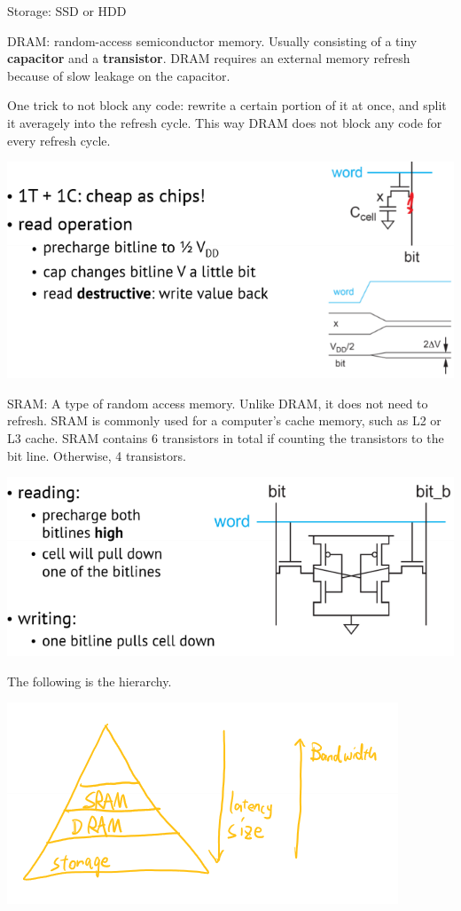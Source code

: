 \documentclass[letterpaper,12pt]{article}
\begin{document}
Storage: SSD or HDD

DRAM: random-access semiconductor memory. Usually consisting of a tiny \textbf{capacitor} and a \textbf{transistor}.
DRAM requires an external memory refresh because of slow leakage on the capacitor.

One trick to not block any code: rewrite a certain portion of it at once, and split it averagely into the refresh cycle. This way DRAM does not block any code for every refresh cycle.

\includegraphics{./Image/DRAM_cells.png}

SRAM: A type of random access memory. Unlike DRAM, it does not need to refresh.
SRAM is commonly used for a computer's cache memory, such as L2 or L3 cache.
SRAM contains 6 transistors in total if counting the transistors to the bit line. Otherwise, 4 transistors.

\includegraphics{Image/SRAM_cell.png}

The following is the hierarchy.

\includegraphics{./Image/Memory_hierarchy.png}
\end{document}
